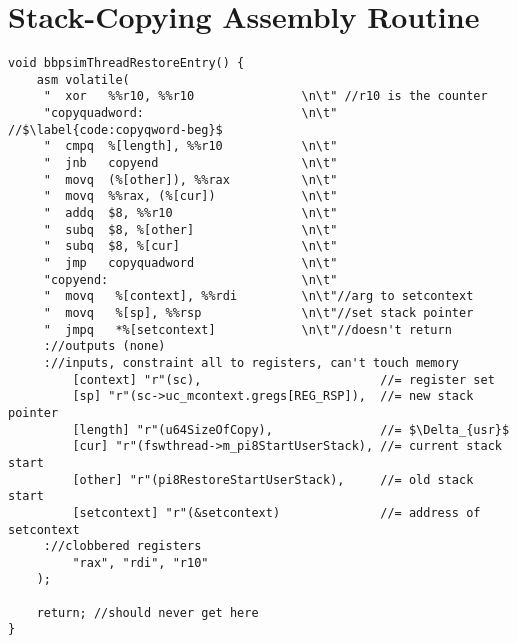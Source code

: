 {\chapter{Stack-Copying Assembly Routine}\label{code:stk-copy-asm}

\begin{verbatim}
void bbpsimThreadRestoreEntry() {
	asm volatile(
	 "  xor   %%r10, %%r10               \n\t" //r10 is the counter
	 "copyquadword:                      \n\t" //$\label{code:copyqword-beg}$
	 "  cmpq  %[length], %%r10           \n\t"
	 "  jnb   copyend                    \n\t"
	 "  movq  (%[other]), %%rax          \n\t"
	 "  movq  %%rax, (%[cur])            \n\t"
	 "  addq  $8, %%r10                  \n\t"
	 "  subq  $8, %[other]               \n\t"
	 "  subq  $8, %[cur]                 \n\t"
	 "  jmp   copyquadword               \n\t"
	 "copyend:                           \n\t"
	 "  movq   %[context], %%rdi         \n\t"//arg to setcontext
	 "  movq   %[sp], %%rsp              \n\t"//set stack pointer
	 "  jmpq   *%[setcontext]            \n\t"//doesn't return
	 ://outputs (none)
	 ://inputs, constraint all to registers, can't touch memory
	     [context] "r"(sc),                         //= register set
	     [sp] "r"(sc->uc_mcontext.gregs[REG_RSP]),  //= new stack pointer
	     [length] "r"(u64SizeOfCopy),               //= $\Delta_{usr}$
	     [cur] "r"(fswthread->m_pi8StartUserStack), //= current stack start
	     [other] "r"(pi8RestoreStartUserStack),     //= old stack start
	     [setcontext] "r"(&setcontext)              //= address of setcontext 
	 ://clobbered registers
	     "rax", "rdi", "r10"
	);
	
	return; //should never get here
}
\end{verbatim}
}